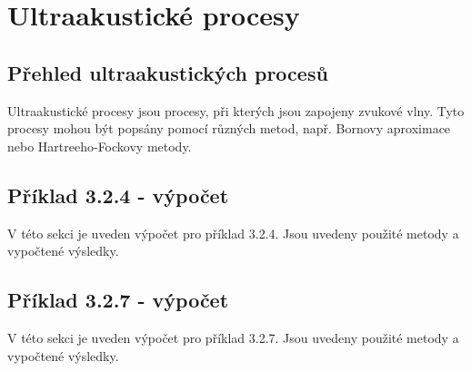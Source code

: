 \section{Ultraakustické procesy}

\subsection{Přehled ultraakustických procesů}

Ultraakustické procesy jsou procesy, při kterých jsou zapojeny zvukové vlny. Tyto procesy mohou být popsány pomocí různých metod, např. Bornovy aproximace nebo Hartreeho-Fockovy metody.

\subsection{Příklad 3.2.4 - výpočet}
\begin{zadani}

\end{zadani}


V této sekci je uveden výpočet pro příklad 3.2.4. Jsou uvedeny použité metody a vypočtené výsledky.

\subsection{Příklad 3.2.7 - výpočet}
\begin{zadani}

\end{zadani}


V této sekci je uveden výpočet pro příklad 3.2.7. Jsou uvedeny použité metody a vypočtené výsledky.
